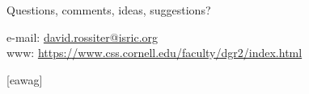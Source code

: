 \documentclass[aspectratio=169, 10pt]{beamer}
\begin{document}


  \begin{frame} 
    \frametitle{}
    \framesubtitle{}

 \begin{center}
 \vspace{0.5cm}
 \textcolor{isric_yellow}{\Large{Questions, comments, ideas, suggestions?}}
 \end{center}
 \textcolor{isric_yellow}{e-mail: \url{david.rossiter@isric.org}}
  \\
  \textcolor{isric_yellow}{www: \url{https://www.css.cornell.edu/faculty/dgr2/index.html}}
\end{frame} 



[eawag] %
\end{document}
